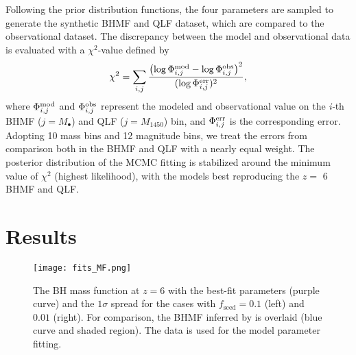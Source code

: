 \documentclass[twocolumn, twocolappendix]{aastex63}
\newcommand{\Mbh}{M_\bullet}
\newcommand{\fseed}{f_\mathrm{seed}}
\newcommand{\Muv}{M_{1450}}
\begin{document}
\begin{CJK*}{UTF8}{gbsn}
  

Following the prior distribution functions, the four parameters are sampled to generate the synthetic 
BHMF and QLF dataset, which are compared to the observational dataset. 
The discrepancy between the model and observational data is evaluated with a $\chi^2$-value defined by
\begin{align}
  \chi^2 = \sum_{i,j}
  \frac{\left(\log{\Phi^{\rm mod}_{i,j}} - \log{\Phi^{\rm obs}_{i,j}}\right)^2}{(\log{\Phi^{\rm err}_{i,j}})^2},
\end{align}
where $\Phi^{\rm mod}_{i,j}$ and $\Phi^{\rm obs}_{i,j}$ represent the modeled and observational value 
on the \textit{i-}th BHMF ($j=\Mbh$) and QLF ($j=\Muv$) bin, and $\Phi^{\rm err}_{i,j}$ is the corresponding error.
Adopting 10 mass bins and 12 magnitude bins, we treat the errors from comparison both in the BHMF and QLF
with a nearly equal weight.
The posterior distribution of the MCMC fitting is stabilized around the minimum value of $\chi^2$ (highest likelihood), 
with the models best reproducing the $z=$ 6 BHMF and QLF.



\vspace{5mm}
\section{Results}\label{sec:result}


\begin{figure*}
\centering
\texttt{[image: fits\_MF.png]}
\caption{
The BH mass function at $z=6$ with the best-fit parameters (purple curve) and the $1\sigma$ spread for the cases with $\fseed=0.1$ (left) and $0.01$ (right). 
For comparison, the BHMF inferred by  is overlaid (blue curve and shaded region).
The data is used for the model parameter fitting.
}
\label{fig:fitmf}
\end{figure*}



\end{CJK*}
\end{document}

